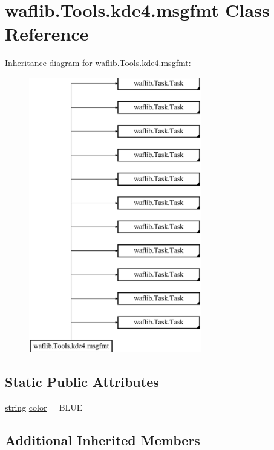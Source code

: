\hypertarget{classwaflib_1_1_tools_1_1kde4_1_1msgfmt}{}\section{waflib.\+Tools.\+kde4.\+msgfmt Class Reference}
\label{classwaflib_1_1_tools_1_1kde4_1_1msgfmt}
Inheritance diagram for waflib.\+Tools.\+kde4.\+msgfmt\+:\begin{figure}[H]
\begin{center}
\leavevmode
\includegraphics[height=12.000000cm]{classwaflib_1_1_tools_1_1kde4_1_1msgfmt}
\end{center}
\end{figure}
\subsection*{Static Public Attributes}
\begin{DoxyCompactItemize}
\item 
\hyperlink{test__lib_f_l_a_c_2format_8c_ab02026ad0de9fb6c1b4233deb0a00c75}{string} \hyperlink{classwaflib_1_1_tools_1_1kde4_1_1msgfmt_a84052c896ddb59b9dca9c9e71e892b3e}{color} = \textquotesingle{}B\+L\+UE\textquotesingle{}
\end{DoxyCompactItemize}
\subsection*{Additional Inherited Members}


